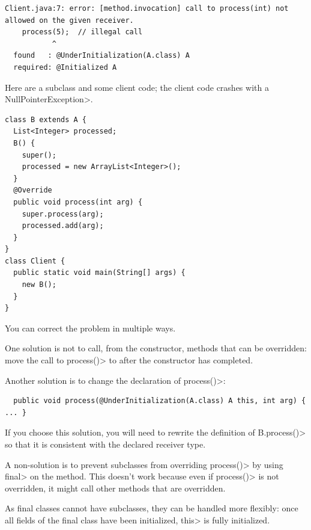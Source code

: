 \begin{Verbatim}
Client.java:7: error: [method.invocation] call to process(int) not allowed on the given receiver.
    process(5);  // illegal call
           ^
  found   : @UnderInitialization(A.class) A
  required: @Initialized A
\end{Verbatim}

Here are a subclass and some client code; the client code crashes with a
\<NullPointerException>.

\begin{Verbatim}
class B extends A {
  List<Integer> processed;
  B() {
    super();
    processed = new ArrayList<Integer>();
  }
  @Override
  public void process(int arg) {
    super.process(arg);
    processed.add(arg);
  }
}
class Client {
  public static void main(String[] args) {
    new B();
  }
}
\end{Verbatim}

You can correct the problem in multiple ways.

One solution is not to call, from the constructor, methods that can be
overridden:  move the call to \<process()> to after the constructor has
completed.

Another solution is to change the declaration of \<process()>:

\begin{Verbatim}
  public void process(@UnderInitialization(A.class) A this, int arg) { ... }
\end{Verbatim}

If you choose this solution, you will need to rewrite the definition of
\<B.process()> so that it is consistent with the declared receiver type.

A non-solution is to prevent subclasses from overriding \<process()> by
using \<final> on the method.  This doesn't work because even if
\<process()> is not overridden, it might call other methods that are
overridden.

As final classes cannot have subclasses, they can be handled more
flexibly: once all fields of the final class have been
initialized, \<this> is fully initialized.





